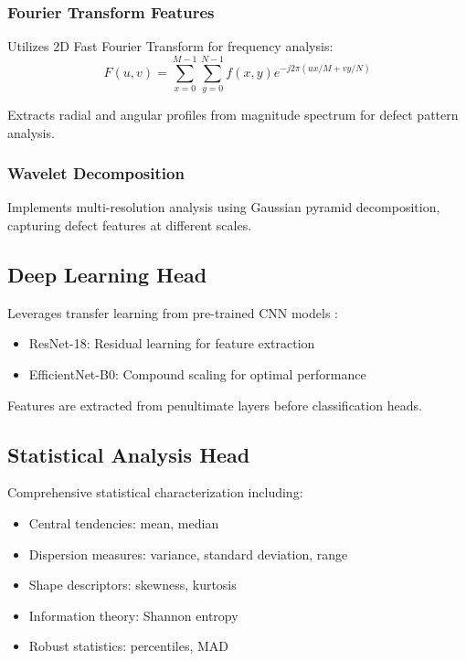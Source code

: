 \documentclass[12pt,a4paper]{article}
\begin{document}
\subsubsection{Fourier Transform Features}
Utilizes 2D Fast Fourier Transform for frequency analysis:
\begin{equation}
F(u,v) = \sum_{x=0}^{M-1}\sum_{y=0}^{N-1} f(x,y)e^{-j2\pi(ux/M + vy/N)}
\end{equation}

Extracts radial and angular profiles from magnitude spectrum for defect pattern analysis.

\subsubsection{Wavelet Decomposition}
Implements multi-resolution analysis using Gaussian pyramid decomposition, capturing defect features at different scales.

\subsection{Deep Learning Head}

Leverages transfer learning from pre-trained CNN models \cite{he2016deep,tan2019efficientnet}:
\begin{itemize}
    \item ResNet-18: Residual learning for feature extraction
    \item EfficientNet-B0: Compound scaling for optimal performance
\end{itemize}

Features are extracted from penultimate layers before classification heads.

\subsection{Statistical Analysis Head}

Comprehensive statistical characterization including:
\begin{itemize}
    \item Central tendencies: mean, median
    \item Dispersion measures: variance, standard deviation, range
    \item Shape descriptors: skewness, kurtosis
    \item Information theory: Shannon entropy
    \item Robust statistics: percentiles, MAD
\end{itemize}
\end{document}
